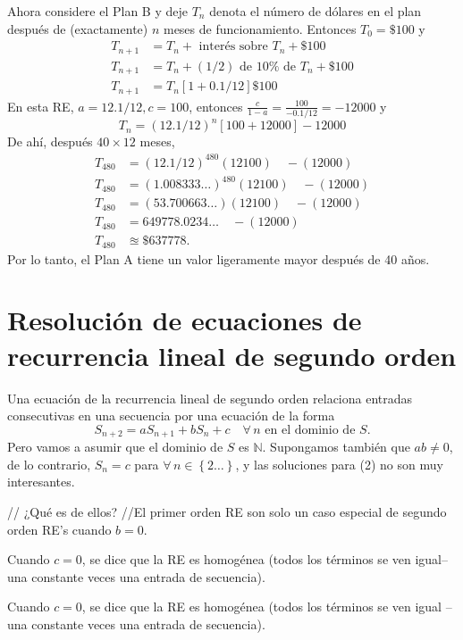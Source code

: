 Ahora considere el Plan B y deje $T_n$ denota el número de dólares en el plan después de (exactamente) $n$ meses de funcionamiento. Entonces $T_{0}=\$100$ y
\begin{align*}
T_{n+1}
&=T_{n}+\text{ interés sobre }T_{n}+\$100\\
T_{n+1}
&= T_{n}+(1/2)\text{ de }10\%\text{ de }T_{n}+\$100\\
T_{n+1}
&=T_{n}\left[1+0.1/12\right]\$100
\end{align*}
En esta RE, $a=12.1/12,c=100$, entonces $\frac{c}{1-a}=\frac{100}{-0.1/12}=-12000$ y
\begin{equation*}
T_{n}=(12.1/12)^{n}\left[100+12000\right]-12000
\end{equation*}
De ahí, después $40\times12$ meses,
\begin{align*}
T_{480}
&=(12.1/12)^{480}(12100)\quad-(12000)\\
T_{480}
&=(1.008333\ldots)^{480}(12100)\quad-(12000)\\
T_{480}
&=(53.700663\ldots)(12100)\quad-(12000)\\
T_{480}
&=649778.0234\ldots \quad-(12000)\\
T_{480}
&\approxeq \$637778.
\end{align*}
Por lo tanto, el Plan A tiene un valor ligeramente mayor después de 40 años.

\section{Resolución de ecuaciones de recurrencia lineal de segundo orden}

Una ecuación de la recurrencia lineal de segundo orden relaciona entradas consecutivas en una secuencia por una ecuación de la forma
\begin{equation}
S_{n+2}=aS_{n+1}+bS_{n}+c\quad\forall\,n\text{ en el dominio de }S.
\end{equation}
Pero vamos a asumir que el dominio de $S$ es $\mathds{N}$. Supongamos también que $ab\neq0$, de lo contrario, $S_{n}=c$ para $\forall\,n \in\left\{2\ldots\right\}$, y las soluciones para (2) no son muy interesantes.

// ¿Qué es de ellos?
//El primer orden RE son solo un caso especial de segundo orden RE’s cuando $b = 0$.

Cuando $c= 0$, se dice que la RE es homogénea (todos los términos se ven igual–una constante veces una entrada de secuencia).

Cuando $c=0$, se dice que la RE es homogénea (todos los términos se ven igual – una constante veces una entrada de secuencia).


